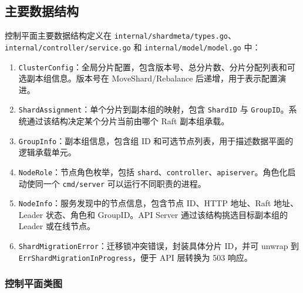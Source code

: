 \documentclass[UTF8,a4paper,12pt]{ctexart}
\begin{document}
\subsection{主要数据结构}

控制平面主要数据结构定义在 \texttt{internal/shardmeta/types.go}、\texttt{internal/controller/service.go} 和 \texttt{internal/model/model.go} 中：
\begin{enumerate}
  \item \texttt{ClusterConfig}：全局分片配置，包含版本号、总分片数、分片分配列表和可选副本组信息。版本号在 MoveShard/Rebalance 后递增，用于表示配置演进。
  \item \texttt{ShardAssignment}：单个分片到副本组的映射，包含 \texttt{ShardID} 与 \texttt{GroupID}。系统通过该结构决定某个分片当前由哪个 Raft 副本组承载。
  \item \texttt{GroupInfo}：副本组信息，包含组 ID 和可选节点列表，用于描述数据平面的逻辑承载单元。
  \item \texttt{NodeRole}：节点角色枚举，包括 \texttt{shard}、\texttt{controller}、\texttt{apiserver}。角色化启动使同一个 \texttt{cmd/server} 可以运行不同职责的进程。
  \item \texttt{NodeInfo}：服务发现中的节点信息，包含节点 ID、HTTP 地址、Raft 地址、Leader 状态、角色和 GroupID。API Server 通过该结构挑选目标副本组的 Leader 或在线节点。
  \item \texttt{ShardMigrationError}：迁移锁冲突错误，封装具体分片 ID，并可 unwrap 到 \texttt{ErrShardMigrationInProgress}，便于 API 层转换为 503 响应。
\end{enumerate}

\subsubsection{控制平面类图}
\end{document}
